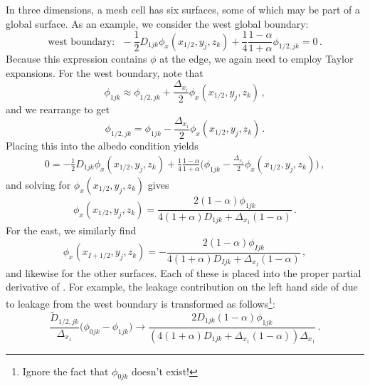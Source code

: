 In three dimensions, a mesh cell has six surfaces, some of which 
may be part of a global surface.  As an example,
we consider the west global boundary:
\begin{equation}
 \text{west boundary}:  \,\,\,  
    -\frac{1}{2}D_{1jk} \phi_x(x_{1/2},y_j,z_k) + 
   \frac{1}{4}\frac{1-\alpha}{1+\alpha}\phi_{1/2,jk} = 0 \, .
\end{equation}
Because this expression contains $\phi$ at the edge, we again need to 
employ Taylor expansions.  For the west boundary, note that
\begin{equation}
 \phi_{1jk} \approx \phi_{1/2,jk} + \frac{\Delta_{x_i}}{2} \phi_x(x_{1/2},y_j,z_k) \, ,
\end{equation}
and we rearrange to get
\begin{equation}
 \phi_{1/2,jk} = \phi_{1jk} - \frac{\Delta_{x_i}}{2} \phi_x(x_{1/2},y_j,z_k) \, .
\end{equation}
Placing this into the albedo condition yields
\begin{equation}
\begin{split}
 0 =  -\frac{1}{2}D_{1jk} \phi_x(x_{1/2},y_j,z_k)  
  + \frac{1}{4}\frac{1-\alpha}{1+\alpha} 
    \Bigg ( \phi_{1jk} - \frac{\Delta_{x_i}}{2} \phi_x(x_{1/2},y_j,z_k) \Bigg ) \, ,
\end{split}
\end{equation}
and solving for $\phi_x(x_{1/2},y_j,z_k)$ gives
\begin{equation}
 \phi_x(x_{  1/2},y_j,z_k) = \frac{2(1-\alpha)\phi_{1jk}}
                                  {4(1+\alpha)D_{1jk} + \Delta_{x_1}(1-\alpha)} \, .
\end{equation}
For the east, we similarly find
\begin{equation}
 \phi_x(x_{I+1/2},y_j,z_k) =-\frac{2(1-\alpha)\phi_{Ijk} }
                                  {4(1+\alpha)D_{Ijk} + \Delta_{x_I}(1-\alpha)} \, ,
\end{equation}
and likewise for the other surfaces. Each of these  is placed into the proper 
partial derivative of .  For example, the leakage
contribution on the left hand side of  due to leakage from 
the west boundary is transformed as 
follows\footnote{Ignore the fact that $\phi_{0jk}$ doesn't exist!}: 
\begin{equation}
  \frac{ \tilde{D}_{1/2,jk}}{\Delta_{x_1}}  \Big (\phi_{0jk} - \phi_{1jk}  \Big )  \rightarrow 
     \frac{2D_{1jk}(1-\alpha) \phi_{1jk}}
      {(4(1+\alpha)D_{1jk} + \Delta_{x_1}(1-\alpha))\Delta_{x_1}} \, .
\label{eq:west_leakage}      
\end{equation}


